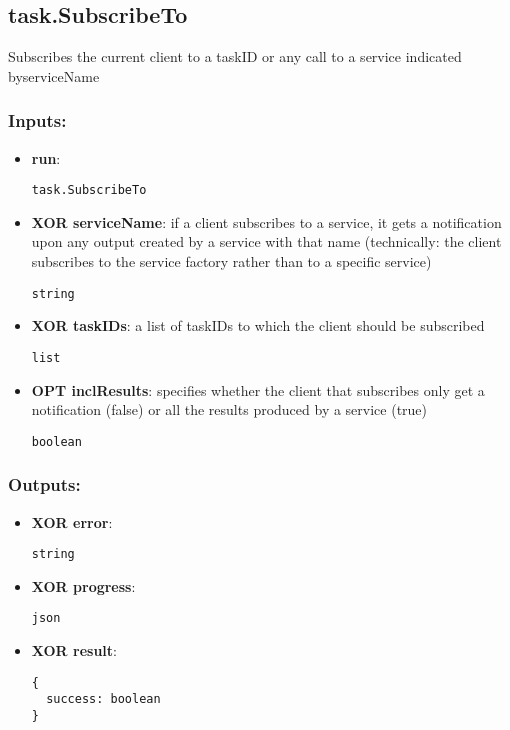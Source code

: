 \subsection{task.SubscribeTo}
\label{ch:builtinservices:task.SubscribeTo}
Subscribes the current client to a taskID or any call to a service indicated byserviceName
\subsubsection*{Inputs:}
\begin{itemize}
  \small
    \item \textbf{run}: 
\begin{lstlisting}
task.SubscribeTo
\end{lstlisting}
    \item \textbf{XOR serviceName}: if a client subscribes to a service, it gets a notification upon any  output created by a service with that name (technically: the client  subscribes to the service factory rather than to a specific service)
\begin{lstlisting}
string
\end{lstlisting}
    \item \textbf{XOR taskIDs}: a list of taskIDs to which the client should be subscribed
\begin{lstlisting}
list
\end{lstlisting}
    \item \textbf{OPT inclResults}: specifies whether the client that subscribes only get a notification (false) or all the results produced by a service (true)
\begin{lstlisting}
boolean
\end{lstlisting}
  \end{itemize}
\subsubsection*{Outputs:}
\begin{itemize}
  \small
    \item \textbf{XOR error}: 
\begin{lstlisting}
string
\end{lstlisting}
    \item \textbf{XOR progress}: 
\begin{lstlisting}
json
\end{lstlisting}
    \item \textbf{XOR result}: 
\begin{lstlisting}
{
  success: boolean
}
\end{lstlisting}
  \end{itemize}


